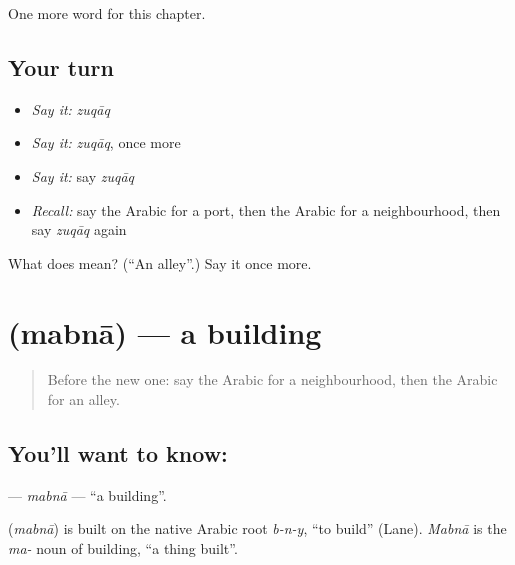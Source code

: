 \begin{grammarlens}[title={What you've built}]
One more word for this chapter.
\end{grammarlens}

\subsection*{Your turn}
\begin{itemize}
\raggedright
  \item \emph{Say it:} \emph{zuqāq}
  \item \emph{Say it:} \emph{zuqāq}, once more
  \item \emph{Say it:} say \emph{zuqāq}
  \item \emph{Recall:} say the Arabic for a port, then the Arabic for a neighbourhood, then say \emph{zuqāq} again
\end{itemize}

\begin{tcolorbox}[breakable,colback=teal!4,colframe=teal!35!black,title={Before you move on}]
What does  mean? (\textquotedblleft{}An alley\textquotedblright{}.) Say it once more.
\end{tcolorbox}
\section[\texorpdfstring{\ar{مبنى} (mabnā)}{مبنى (mabnā)}]{ (mabnā) — a building}

\label{lesson:AR-C101-mabna}



\begin{quote}
Before the new one: say the Arabic for a neighbourhood, then the Arabic for an alley.
\end{quote}

\subsection*{You'll want to know: }
\textbf{} — \emph{mabnā} — \textquotedblleft{}a building\textquotedblright{}.

\begin{cousinweb}
\textbf{} (\emph{mabnā}) is built on the native Arabic root \emph{b-n-y}, \textquotedblleft{}to build\textquotedblright{} (Lane). \emph{Mabnā} is the \emph{ma-} noun of building, \textquotedblleft{}a thing built\textquotedblright{}.
\end{cousinweb}

